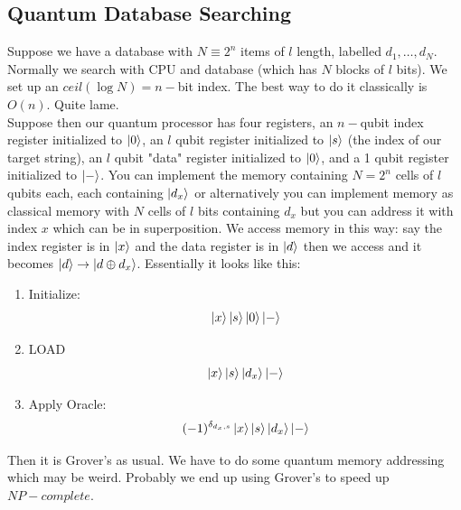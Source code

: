 \documentclass{article}
\begin{document}
\subsection{Quantum Database Searching}Suppose we have a database with $N\equiv 2^n$ items of $l$ length, labelled $d_1, \dots, d_N$. Normally we search with CPU and database (which has $N$ blocks of $l$ bits). We set up an $ceil(\log N) = n-$bit index. The best way to do it classically is $O(n)$. Quite lame.\\
Suppose then our quantum processor has four registers, an $n-$qubit index register initialized to $\ket{0}$, an $l$ qubit register initialized to $\ket{s}$ (the index of our target string), an $l$ qubit "data" register initialized to $\ket{0}$, and a 1 qubit register initialized to $\ket{-}$. You can implement the memory containing $N = 2^n$ cells of $l$ qubits each, each containing $\ket{d_x}$ or alternatively you can implement memory as classical memory with $N$ cells of $l$ bits containing $d_x$ but you can address it with index $x$ which can be in superposition. We access memory in this way: say the index register is in $\ket{x}$ and the data register is in $\ket{d}$ then we access and it becomes $\ket{d} \to \ket{d \oplus d_x}$.
Essentially it looks like this:
\begin{enumerate}
	\item Initialize:
		$$\ket{x}\ket{s}\ket{0}\ket{-}$$
	\item LOAD
		$$\ket{x}\ket{s}\ket{d_x}\ket{-}$$
	\item Apply Oracle:
		$$(-1)^{\delta_{d_x, s}}\ket{x}\ket{s}\ket{d_x}\ket{-}$$
\end{enumerate}
Then it is Grover's as usual. We have to do some quantum memory addressing which may be weird. Probably we end up using Grover's to speed up $NP-complete.$
\end{document}
